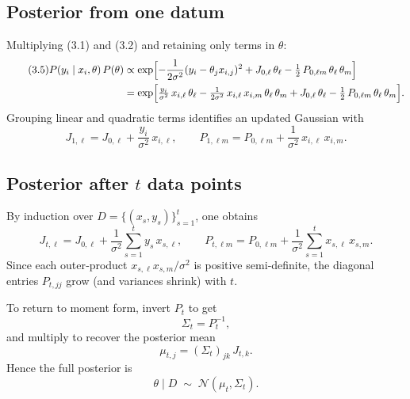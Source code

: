 \documentclass[11pt]{article}
\begin{document}
\subsection{Posterior from one datum}

Multiplying (3.1) and (3.2) and retaining only terms in $\theta$:
\begin{align}\tag{3.5}
P(y_i\mid x_i,\theta)\,P(\theta)
&\propto
\exp\Bigl[
-{1\over2\sigma^2}(y_i - \theta_j x_{i,j})^2
+ J_{0,\ell}\,\theta_\ell
- \tfrac12\,P_{0,\ell m}\,\theta_\ell\,\theta_m
\Bigr]
\nonumber\\
&=
\exp\Bigl[
\tfrac{y_i}{\sigma^2}\,x_{i,\ell}\,\theta_\ell
- \tfrac{1}{2\sigma^2}\,x_{i,\ell}\,x_{i,m}\,\theta_\ell\,\theta_m
+ J_{0,\ell}\,\theta_\ell
- \tfrac12\,P_{0,\ell m}\,\theta_\ell\,\theta_m
\Bigr].
\end{align}
Grouping linear and quadratic terms identifies an updated Gaussian with
\begin{equation}\tag{3.6}
J_{1,\ell} = J_{0,\ell} + \frac{y_i}{\sigma^2}\,x_{i,\ell},
\qquad
P_{1,\ell m} = P_{0,\ell m} + \frac{1}{\sigma^2}\,x_{i,\ell}\,x_{i,m}.
\end{equation}

\subsection{Posterior after $t$ data points}

By induction over $D=\{(x_s,y_s)\}_{s=1}^t$, one obtains
\begin{equation}\tag{3.7}
J_{t,\ell}
= J_{0,\ell} + \frac{1}{\sigma^2}\sum_{s=1}^t y_s\,x_{s,\ell},
\qquad
P_{t,\ell m}
= P_{0,\ell m} + \frac{1}{\sigma^2}\sum_{s=1}^t x_{s,\ell}\,x_{s,m}.
\end{equation}
Since each outer‐product $x_{s,\ell}x_{s,m}/\sigma^2$ is positive semi‐definite, the diagonal entries $P_{t,jj}$ grow (and variances shrink) with $t$.

To return to moment form, invert $P_t$ to get
\[
\Sigma_t = P_t^{-1},
\]
and multiply to recover the posterior mean
\begin{equation}\tag{3.8}
\mu_{t,j} = (\Sigma_t)_{jk}\,J_{t,k}.
\end{equation}
Hence the full posterior is
\begin{equation}\tag{3.9}
\theta \mid D \;\sim\; \mathcal{N}(\mu_t,\Sigma_t).
\end{equation}
\end{document}
